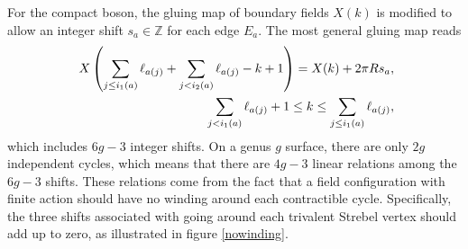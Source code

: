 \documentclass[12pt]{article}
\def\ie{\begin{equation}\begin{aligned}}
\def\fe{\end{aligned}\end{equation}}
\numberwithin{equation}{section}
\begin{document}
For the compact boson, the gluing map of boundary fields $X(k)$ is modified to allow an integer shift $s_a \in \mathbb{Z}$ for each edge $E_a$. The most general gluing map reads
\ie
~X\left(\sum_{j\leq i_1(a)}\ell_{a(j)}+\sum_{j<i_2(a)}\ell_{a(j)}-k+1\right)=X(k)+2\pi R s_a, \\
\hspace{1.2cm}\sum_{j<i_1(a)}\ell_{a(j)}+1\leq k\leq\sum_{j\leq i_1(a)}\ell_{a(j)},
\fe
which includes $6g-3$ integer shifts. On a genus $g$ surface, there are only $2g$ independent cycles, which means that there are $4g-3$ linear relations among the $6g-3$ shifts. These relations come from the fact that a field configuration with finite action should have no winding around each contractible cycle. Specifically, the three shifts associated with going around each trivalent Strebel vertex should add up to zero, as illustrated in figure \ref{nowinding}.
\end{document}
